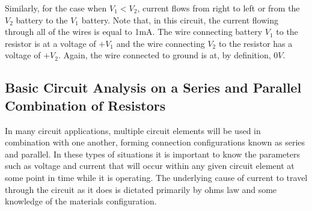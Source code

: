 \documentclass[12pt]{article}
\begin{document}
Similarly, for the case when $V_1 < V_2$, current flows from right to left or from the $V_2$ battery to the $V_1$ battery. Note that, in this circuit, the current flowing through all of the wires is equal to 1mA. The wire connecting battery $V_1$ to the resistor is at a voltage of $+V_1$ and the wire connecting $V_2$ to the resistor has a voltage of $+V_2$.  Again, the wire connected to ground is at, by definition, $0V$.

\subsection{Basic Circuit Analysis on a Series and Parallel Combination of Resistors}
In many circuit applications, multiple circuit elements will be used in combination with one another, forming connection configurations known as series and parallel. In these types of situations it is important to know the parameters such as voltage and current that will occur within any given circuit element at some point in time while it is operating. The underlying cause of current to travel through the circuit as it does is dictated primarily by ohms law and some knowledge of the materials configuration.
\end{document}
